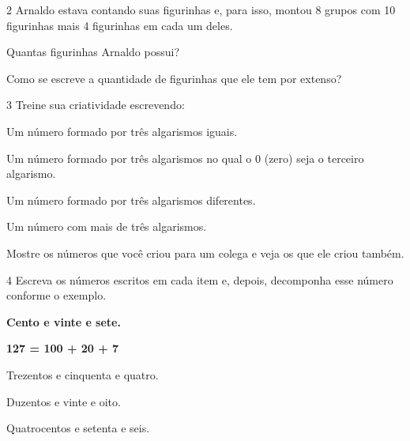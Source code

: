 \num{2} Arnaldo estava contando suas figurinhas e, para isso, montou 8 grupos com
10 figurinhas mais 4 figurinhas em cada um deles.

\begin{escolha}
\item
  Quantas figurinhas Arnaldo possui?


\item
  Como se escreve a quantidade de figurinhas que ele tem por extenso?

\end{escolha}

\num{3} Treine sua criatividade escrevendo:

\begin{escolha}
\item Um número formado por três algarismos iguais.


\item Um número formado por três algarismos no qual o 0 (zero) seja o terceiro algarismo.


\item Um número formado por três algarismos diferentes.


\item Um número com mais de três algarismos.


\item Mostre os números que você criou para um colega e veja os que ele criou também.
\end{escolha}

\num{4} Escreva os números escritos em cada item e, depois, decomponha esse número conforme o exemplo.

\begin{myquote}\Large
\textbf{Cento e vinte e sete.}

\textbf{127 = 100 + 20 + 7}
\end{myquote}


\begin{escolha}
\item Trezentos e cinquenta e quatro.


\item Duzentos e vinte e oito.


\item Quatrocentos e setenta e seis.

\end{escolha}

